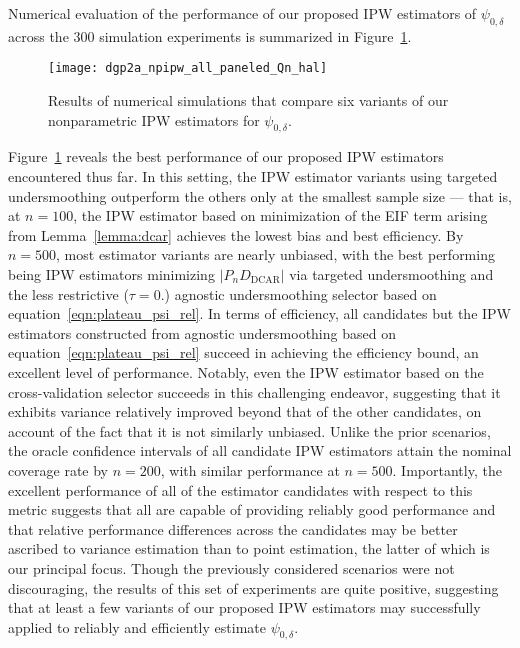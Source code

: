 Numerical evaluation of the performance of our proposed IPW estimators of
$\psi_{0,\delta}$ across the $300$ simulation experiments is summarized in
Figure~\ref{fig:dgp2a_npipw}.
\begin{figure}[H]
  \centering
  \texttt{[image: dgp2a\_npipw\_all\_paneled\_Qn\_hal]}
  \caption{Results of numerical simulations that compare six variants of our
  nonparametric IPW estimators for $\psi_{0,\delta}$.}
  \label{fig:dgp2a_npipw}
\end{figure}
Figure~\ref{fig:dgp2a_npipw} reveals the best performance of our proposed IPW
estimators encountered thus far. In this setting, the IPW estimator variants
using targeted undersmoothing outperform the others only at the smallest sample
size --- that is, at $n=100$, the IPW estimator based on minimization of the
EIF term arising from Lemma~\ref{lemma:dcar} achieves the lowest bias and best
efficiency. By $n=500$, most estimator variants are nearly unbiased, with the
best performing being IPW estimators minimizing $\lvert P_n D_\text{DCAR}
\rvert$ via targeted undersmoothing and the less restrictive ($\tau = 0.$)
agnostic undersmoothing selector based on equation~\ref{eqn:plateau_psi_rel}. In
terms of efficiency, all candidates but the IPW estimators constructed from
agnostic undersmoothing based on equation~\ref{eqn:plateau_psi_rel} succeed in
achieving the efficiency bound, an excellent level of performance. Notably, even
the IPW estimator based on the cross-validation selector succeeds in this
challenging endeavor, suggesting that it exhibits variance relatively improved
beyond that of the other candidates, on account of the fact that it is not
similarly unbiased. Unlike the prior scenarios, the oracle confidence intervals
of all candidate IPW estimators attain the nominal coverage rate by $n=200$,
with similar performance at $n=500$. Importantly, the excellent performance of
all of the estimator candidates with respect to this metric suggests that all
are capable of providing reliably good performance and that relative performance
differences across the candidates may be better ascribed to variance estimation
than to point estimation, the latter of which is our principal focus. Though the
previously considered scenarios were not discouraging, the results of this set
of experiments are quite positive, suggesting that at least a few variants of
our proposed IPW estimators may successfully applied to reliably and efficiently
estimate $\psi_{0,\delta}$.

